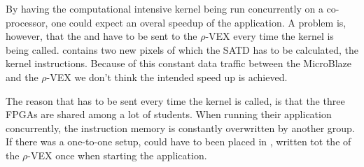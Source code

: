 By having the computational intensive kernel being run concurrently on a co-processor, one could expect an overal speedup of the application. A problem is, however, that the  and  have to be sent to the $\rho$-VEX every time the kernel is being called.  contains two new pixels of which the SATD has to be calculated,  the kernel instructions. Because of this constant data traffic between the MicroBlaze and the $\rho$-VEX we don't think the intended speed up is achieved.


The reason that  has to be sent every time the kernel is called, is that the three FPGAs are shared among a lot of students. When running their application concurrently, the instruction memory is constantly overwritten by another group. If there was a one-to-one setup,  could have to been placed in , written tot the  of the $\rho$-VEX once when starting the application. 


